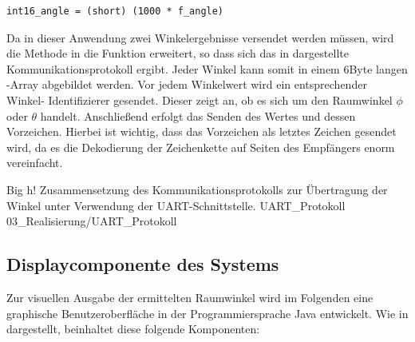 \begin{lstlisting}[caption={Konvertierung vom Datentyp \code{float} in Typ \code{short} mit 3 Nachkommastellen.}, label=lst:float2Short,frame=htlrb, firstnumber=1]
    int16_angle = (short) (1000 * f_angle)
\end{lstlisting}

Da in dieser Anwendung zwei Winkelergebnisse versendet werden müssen, wird die \og Methode in die Funktion  erweitert, so dass sich das in  dargestellte Kommunikationsprotokoll ergibt. Jeder Winkel kann somit in einem 6Byte langen -Array abgebildet werden. Vor jedem Winkelwert wird ein entsprechender Winkel-
Identifizierer gesendet. Dieser zeigt an, ob es sich um den Raumwinkel $\phi$ oder $\theta$ handelt. Anschließend erfolgt das Senden des Wertes und dessen Vorzeichen. Hierbei ist wichtig, dass das Vorzeichen als letztes Zeichen gesendet wird, da es die Dekodierung der Zeichenkette auf Seiten des Empfängers enorm vereinfacht.



         {Big}                                              %
         {h!}                                                  %
         {Zusammensetzung des Kommunikationsprotokolls zur Übertragung der Winkel unter Verwendung der UART-Schnittstelle.}       %
         {UART_Protokoll}                                 %
         {03_Realisierung/UART_Protokoll}                 %




\subsection{Displaycomponente des Systems}
\label{subsec:DisplaycomponenteDesSystems}
Zur visuellen Ausgabe der ermittelten Raumwinkel wird im Folgenden eine graphische Benutzeroberfläche in der Programmiersprache Java entwickelt. Wie in  dargestellt, beinhaltet diese folgende Komponenten:

